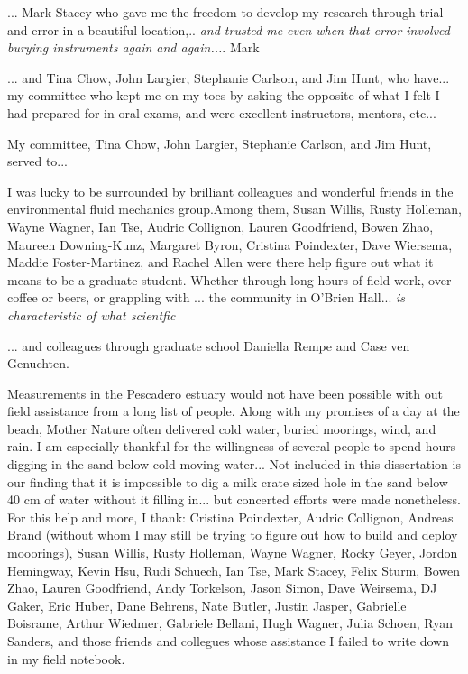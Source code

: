 
... Mark Stacey who gave me the freedom to develop my research through trial and error in a beautiful location,.. 
\emph{and trusted me even when that error involved burying instruments again and again...}. Mark 


... and Tina Chow, John Largier, Stephanie Carlson, and Jim Hunt, who have... 
my committee who kept me on my toes by asking the opposite of what I felt I had prepared for in oral exams, and were excellent instructors, mentors, etc... 

My committee, Tina Chow, John Largier, Stephanie Carlson, and Jim Hunt, served to... 

I was lucky to be surrounded by brilliant colleagues and wonderful friends in the environmental fluid mechanics group.Among them, Susan Willis, Rusty Holleman, Wayne Wagner, Ian Tse, Audric Collignon, Lauren Goodfriend, Bowen Zhao, Maureen Downing-Kunz, Margaret Byron, Cristina Poindexter, Dave Wiersema, Maddie Foster-Martinez, and Rachel Allen were there help figure out what it means to be a graduate student.  Whether through long hours of field work, over coffee or beers, or grappling with ... the community in O'Brien Hall... \emph{is characteristic of what scientfic }


... and colleagues through graduate school Daniella Rempe and Case ven Genuchten. 

Measurements in the Pescadero estuary would not have been possible with out field assistance from a long list of people. Along with my promises of a day at the beach, Mother Nature often delivered cold water, buried moorings, wind, and rain. I am especially thankful for the willingness of several people to spend hours digging in the sand below cold moving water... Not included in this dissertation is our finding that it is impossible to dig a milk crate sized hole in the sand below 40 cm of water without it filling in... but concerted efforts were made nonetheless.  For this help and more, I thank: Cristina Poindexter, Audric Collignon, Andreas Brand (without whom I may still be trying to figure out how to build and deploy mooorings), Susan Willis, Rusty Holleman, Wayne Wagner, Rocky Geyer, Jordon Hemingway, Kevin Hsu, Rudi Schuech, Ian Tse, Mark Stacey, Felix Sturm, Bowen Zhao, Lauren Goodfriend, Andy Torkelson, Jason Simon, Dave Weirsema, DJ Gaker, Eric Huber, Dane Behrens, Nate Butler, Justin Jasper, Gabrielle Boisrame, Arthur Wiedmer, Gabriele Bellani, Hugh Wagner, Julia Schoen, Ryan Sanders, and those friends and collegues whose assistance I failed to write down in my field notebook. 

